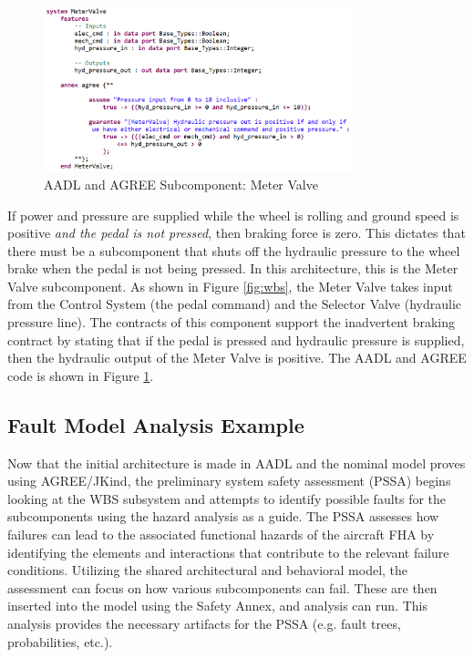\begin{figure}[h!]
	\vspace{-0.2in}
	\begin{center}
		\includegraphics[width=0.8\textwidth]{images/metervalve.png}
	\end{center}
	\vspace{-0.3in}
	\caption{AADL and AGREE Subcomponent: Meter Valve}
	\label{fig:metervalve}
\end{figure} 

If power and pressure are supplied while the wheel is rolling and ground speed is positive \textit{and the pedal is not pressed}, then braking force is zero. This dictates that there must be a subcomponent that shuts off the hydraulic pressure to the wheel brake when the pedal is not being pressed. In this architecture, this is the Meter Valve subcomponent. As shown in Figure
\ref{fig:wbs}, the Meter Valve takes input from the Control System (the pedal command) and the Selector Valve (hydraulic pressure line). The contracts of this component support the inadvertent braking contract by stating that if the pedal is pressed and hydraulic pressure is supplied, then the hydraulic output of the Meter Valve is positive. The AADL and AGREE code is shown in Figure \ref{fig:metervalve}. 

 

\subsection{Fault Model Analysis Example}
Now that the initial architecture is made in AADL and the nominal model proves using AGREE/JKind, the preliminary system safety assessment (PSSA) begins looking at the WBS subsystem and attempts to identify possible faults for the subcomponents using the hazard analysis as a guide. The PSSA assesses how failures can lead to the associated functional hazards of the aircraft FHA by identifying the elements and interactions that contribute to the relevant failure conditions. Utilizing the shared architectural and behavioral model, the assessment can focus on how various subcomponents can fail. These are then inserted into the model using the Safety Annex, and analysis can run. This analysis provides the necessary artifacts for the PSSA (e.g. fault trees, probabilities, etc.). 

